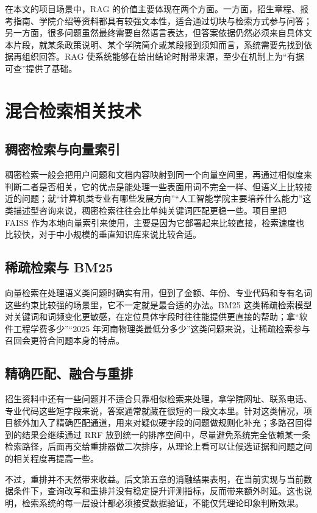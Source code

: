 \documentclass[UTF8,zihao=-4,oneside]{ctexbook}
\numberwithin{equation}{chapter}
\begin{document}
在本文的项目场景中，RAG 的价值主要体现在两个方面。一方面，招生章程、报考指南、学院介绍等资料都具有较强文本性，适合通过切块与检索方式参与问答；另一方面，很多问题虽然最终需要自然语言表达，但答案依据仍然必须来自具体文本片段，就某条政策说明、某个学院简介或某段报到须知而言，系统需要先找到依据再组织回答。RAG 使系统能够在给出结论时附带来源，至少在机制上为“有据可查”提供了基础。

\section{混合检索相关技术}
\subsection{稠密检索与向量索引}
稠密检索一般会把用户问题和文档内容映射到同一个向量空间里，再通过相似度来判断二者是否相关，它的优点是能处理一些表面用词不完全一样、但语义上比较接近的问题；就“计算机类专业有哪些发展方向”“人工智能学院主要培养什么能力”这类描述型咨询来说，稠密检索往往会比单纯关键词匹配更稳一些。项目里把 FAISS 作为本地向量索引来使用，主要是因为它部署起来比较直接，检索速度也比较快，对于中小规模的垂直知识库来说比较合适\cite{johnson2017faiss}。

\subsection{稀疏检索与 BM25}
向量检索在处理语义类问题时确实有用，但到了金额、年份、专业代码和专有名词这些约束比较强的场景里，它不一定就是最合适的办法。BM25 这类稀疏检索模型对关键词和词频变化更敏感，在定位具体字段时往往能提供更直接的帮助\cite{robertson2009bm25}；拿“软件工程学费多少”“2025 年河南物理类最低分多少”这类问题来说，让稀疏检索参与召回会更符合问题本身的特点。

\subsection{精确匹配、融合与重排}
招生资料中还有一些问题并不适合只靠相似检索来处理，拿学院网址、联系电话、专业代码这些短字段来说，答案通常就藏在很短的一段文本里。针对这类情况，项目额外加入了精确匹配通道，用来对疑似硬字段的问题做规则化补充；多路召回得到的结果会继续通过 RRF 放到统一的排序空间中，尽量避免系统完全依赖某一条检索路径\cite{cormack2009rrf}，后面再交给重排器做二次排序，从理论上看可以让候选证据和问题之间的相关程度再提高一些。

不过，重排并不天然带来收益。后文第五章的消融结果表明，在当前实现与当前数据条件下，查询改写和重排并没有稳定提升评测指标，反而带来额外时延。这也说明，检索系统的每一层设计都必须接受数据验证，不能仅凭理论印象判断效果。
\end{document}
